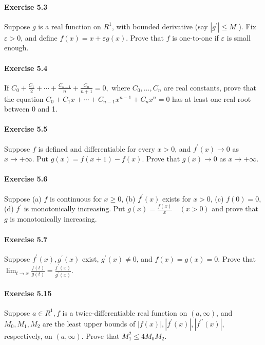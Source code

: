 \documentclass{article}
\begin{document}
\paragraph{Exercise 5.3} Suppose $g$ is a real function on $R^{1}$, with bounded derivative (say $\left|g^{\prime}\right| \leq M$ ). Fix $\varepsilon>0$, and define $f(x)=x+\varepsilon g(x)$. Prove that $f$ is one-to-one if $\varepsilon$ is small enough.

\paragraph{Exercise 5.4} If $C_{0}+\frac{C_{1}}{2}+\cdots+\frac{C_{n-1}}{n}+\frac{C_{n}}{n+1}=0,$ where $C_{0}, \ldots, C_{n}$ are real constants, prove that the equation $C_{0}+C_{1} x+\cdots+C_{n-1} x^{n-1}+C_{n} x^{n}=0$ has at least one real root between 0 and 1.

\paragraph{Exercise 5.5} Suppose $f$ is defined and differentiable for every $x>0$, and $f^{\prime}(x) \rightarrow 0$ as $x \rightarrow+\infty$. Put $g(x)=f(x+1)-f(x)$. Prove that $g(x) \rightarrow 0$ as $x \rightarrow+\infty$.

\paragraph{Exercise 5.6} Suppose (a) $f$ is continuous for $x \geq 0$, (b) $f^{\prime}(x)$ exists for $x>0$, (c) $f(0)=0$, (d) $f^{\prime}$ is monotonically increasing. Put $g(x)=\frac{f(x)}{x} \quad(x>0)$ and prove that $g$ is monotonically increasing.

\paragraph{Exercise 5.7} Suppose $f^{\prime}(x), g^{\prime}(x)$ exist, $g^{\prime}(x) \neq 0$, and $f(x)=g(x)=0$. Prove that $\lim _{t \rightarrow x} \frac{f(t)}{g(t)}=\frac{f^{\prime}(x)}{g^{\prime}(x)}.$

\paragraph{Exercise 5.15} Suppose $a \in R^{1}, f$ is a twice-differentiable real function on $(a, \infty)$, and $M_{0}, M_{1}, M_{2}$ are the least upper bounds of $|f(x)|,\left|f^{\prime}(x)\right|,\left|f^{\prime \prime}(x)\right|$, respectively, on $(a, \infty)$. Prove that $M_{1}^{2} \leq 4 M_{0} M_{2} .$
\end{document}
